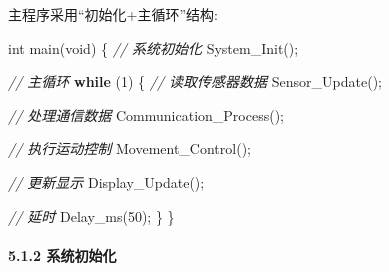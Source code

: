 \documentclass[
]{article}
\newenvironment{Shaded}{}{}
\newcommand{\CommentTok}[1]{\textcolor[rgb]{0.38,0.63,0.69}{\textit{#1}}}
\newcommand{\ControlFlowTok}[1]{\textcolor[rgb]{0.00,0.44,0.13}{\textbf{#1}}}
\newcommand{\DataTypeTok}[1]{\textcolor[rgb]{0.56,0.13,0.00}{#1}}
\newcommand{\DecValTok}[1]{\textcolor[rgb]{0.25,0.63,0.44}{#1}}
\newcommand{\NormalTok}[1]{#1}
\begin{document}
主程序采用``初始化+主循环''结构:

\begin{Shaded}
\begin{Highlighting}[]
\DataTypeTok{int}\NormalTok{ main(}\DataTypeTok{void}\NormalTok{)}
\NormalTok{\{}
    \CommentTok{// 系统初始化}
\NormalTok{    System\_Init();}
    
    \CommentTok{// 主循环}
    \ControlFlowTok{while}\NormalTok{ (}\DecValTok{1}\NormalTok{) \{}
        \CommentTok{// 读取传感器数据}
\NormalTok{        Sensor\_Update();}
        
        \CommentTok{// 处理通信数据}
\NormalTok{        Communication\_Process();}
        
        \CommentTok{// 执行运动控制}
\NormalTok{        Movement\_Control();}
        
        \CommentTok{// 更新显示}
\NormalTok{        Display\_Update();}
        
        \CommentTok{// 延时}
\NormalTok{        Delay\_ms(}\DecValTok{50}\NormalTok{);}
\NormalTok{    \}}
\NormalTok{\}}
\end{Highlighting}
\end{Shaded}

\hypertarget{ux7cfbux7edfux521dux59cbux5316}{%
\paragraph{5.1.2 系统初始化}\label{ux7cfbux7edfux521dux59cbux5316}}
\end{document}
